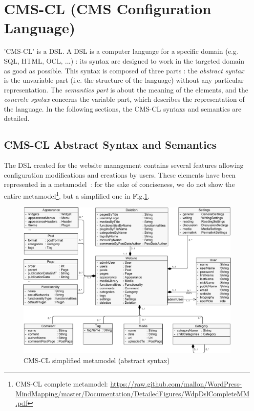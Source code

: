 \section{CMS-CL (CMS Configuration Language)}\label{CMS-CL}		
'CMS-CL' is a DSL. A DSL\cite{dslDefine} is a computer language for a specific domain (e.g. SQL, HTML, OCL, ...) : its syntax are designed to work in the targeted domain as good as possible. This syntax is composed of three parts : the \textit{abstract syntax} is the unvariable part (i.e. the structure of the language) without any particular representation. The \textit{semantics part} is about the meaning of the elements, and the \textit{concrete syntax} concerns the variable part, which describes the representation of the language. 
In the following sections, the CMS-CL syntaxs and semantics are detailed.		
			
			\subsection{CMS-CL Abstract Syntax and Semantics}\label{abstractSyntax} 
The DSL created for the website management contains several features allowing configuration modifications and creations by users. These elements have been represented in a metamodel~\cite{metaExplanation}: for the sake of conciseness, we do not show the entire metamodel\footnote{\scriptsize{CMS-CL complete metamodel: \url{https://raw.github.com/mallon/WordPress-MindMapping/master/Documentation/DetailedFigures/WdpDslCompleteMM.pdf}}}, but a simplified one in Fig.\ref{CMS-CLMetamodel}.
				\begin{figure}[!h]
					\centering
					\includegraphics[width=\textwidth]{../resources/pdf/WOCMMSimplified.pdf}
					\caption{CMS-CL simplified metamodel (abstract syntax)}
					\label{CMS-CLMetamodel}
				\end{figure}	
							 								

